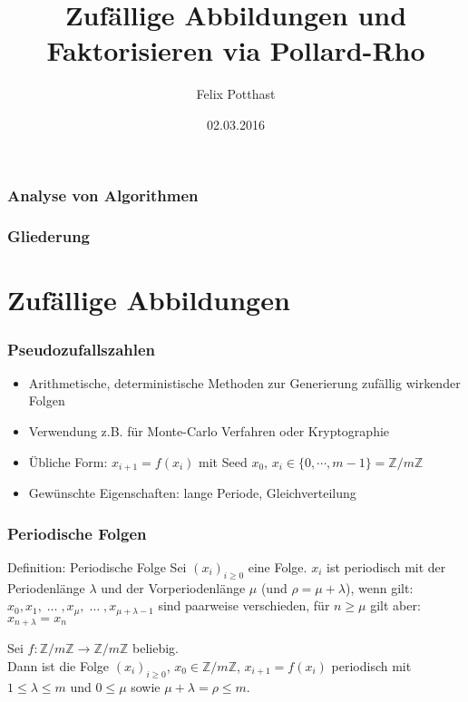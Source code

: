 \documentclass{beamer}
\title[Pollard-Rho]{Zufällige Abbildungen und Faktorisieren via Pollard-Rho}
\author{Felix Potthast}
\date{02.03.2016}
\begin{document}
\begin{frame}
	\frametitle{Analyse von Algorithmen}
	\titlepage
\end{frame}


\begin{frame}
	\frametitle{Gliederung}
	\tableofcontents
\end{frame}


\section{Zufällige Abbildungen}


\begin{frame}
	\frametitle{Pseudozufallszahlen}
	\begin{itemize}
		\item Arithmetische, deterministische Methoden zur Generierung zufällig wirkender Folgen
		\item Verwendung z.B. für Monte-Carlo Verfahren oder Kryptographie
		\item Übliche Form: \(x_{i+1}=f(x_i)\) mit Seed \(x_0\), \(x_i \in \{0,\cdots,m-1\} = \mathbb Z/m\mathbb Z\)
		\item Gewünschte Eigenschaften: lange Periode, Gleichverteilung
	\end{itemize}
\end{frame}


\begin{frame}
\frametitle{Periodische Folgen}
	\begin{block}{Definition: Periodische Folge}
		Sei \((x_i)_{i \geq 0}\) eine Folge.  \(x_i\) ist periodisch mit der Periodenlänge \(\lambda\)
		und der Vorperiodenlänge \(\mu\) (und \(\rho=\mu+\lambda\)), wenn gilt:\\
		\(x_0,x_1,\;\dots\;, x_\mu, \;\dots\;, x_{\mu + \lambda - 1}\) sind paarweise verschieden,
		für \(n \geq \mu\) gilt aber: \(x_{n+\lambda}=x_n\)
	\end{block}
	Sei \(f: \mathbb Z/m\mathbb Z \to \mathbb Z/m\mathbb Z \) beliebig. \\
	Dann ist die Folge \((x_i)_{i \geq 0}\), \(x_0 \in \mathbb Z/m\mathbb Z\), \(x_{i+1}=f(x_i)\)
	periodisch mit \(1 \leq \lambda \leq m\) und \(0 \leq \mu\) sowie \(\mu+\lambda=\rho \leq m\).
\end{frame}
\end{document}
